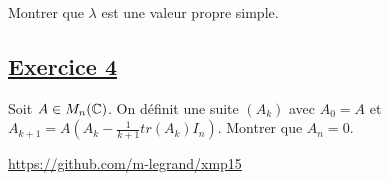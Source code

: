 \documentclass[12pt,a4paper]{report}
\begin{document}
Montrer que $\lambda$ est une valeur propre simple.

\subsection*{\underline{Exercice 4}} %
Soit $A\in M_n(\mathbb{C})$. On définit une suite $(A_k)$ avec $A_0=A$ et $A_{k+1}=A(A_k-\frac{1}{k+1}tr(A_k)I_n)$. Montrer que $A_n=0$.

\vfill

\begin{center}
\url{https://github.com/m-legrand/xmp15}
\end{center}
\end{document}
